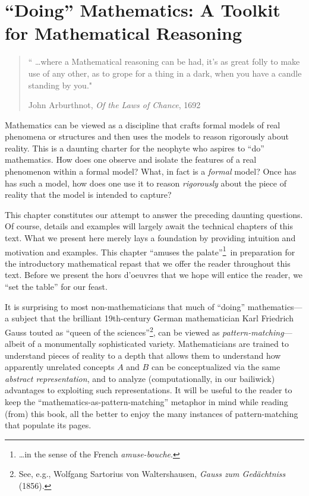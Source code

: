 
\chapter{``Doing'' Mathematics:
A Toolkit for Mathematical Reasoning}
\label{ch:doingmath}


\begin{quote}
`` \ldots where a Mathematical reasoning can be had, it's as great
  folly to make use of any other, as to grope for a thing in a dark,
  when you have a candle standing by you."

\hspace*{2in} John Arburthnot, {\it Of the Laws of Chance}, 1692
\end{quote}

\bigskip

\noindent
Mathematics can be viewed as a discipline that crafts formal models of real phenomena or structures and then uses the models to reason rigorously about reality.  This is a daunting charter for the neophyte who aspires to ``do'' mathematics.  How does one observe and isolate
the features of a real phenomenon within a formal model?  What, in fact is a {\em formal} model?  Once has has such a model, how does one use it to reason {\em rigorously} about the piece of reality that the model is intended to capture?

This chapter constitutes our attempt to answer the preceding daunting questions.  Of course, details and examples will largely await the technical chapters of this text.  What we present here merely lays a foundation by providing intuition and motivation and examples.  This chapter ``amuses the palate''\footnote{\ldots in the sense of the French {\em amuse-bouche}.}~in preparation for the introductory mathematical repast that we offer the reader throughout this text.   Before we present the hors d'oeuvres that we hope will entice the reader, we ``set the table'' for our feast.

\medskip

It is surprising to most non-mathematicians that much of ``doing'' mathematics---a subject that the brilliant 19th-century German mathematician Karl Friedrich Gauss touted as ``queen of the sciences''\footnote{See, e.g., Wolfgang Sartorius von Waltershausen, {\it Gauss zum Ged\"{a}chtniss} (1856).}, can be viewed as {\em pattern-matching}---albeit of a monumentally sophisticated variety.  Mathematicians are trained to understand pieces of reality to a depth that allows them to understand how apparently unrelated concepts $A$ and $B$ can be conceptualized via the same {\em abstract representation}, and to analyze (computationally, in our bailiwick) advantages to exploiting such representations.  It will be useful to the reader to keep the ``mathematics-as-pattern-matching'' metaphor in mind while reading (from) this book, all the better to enjoy the many instances of pattern-matching that populate its pages.


